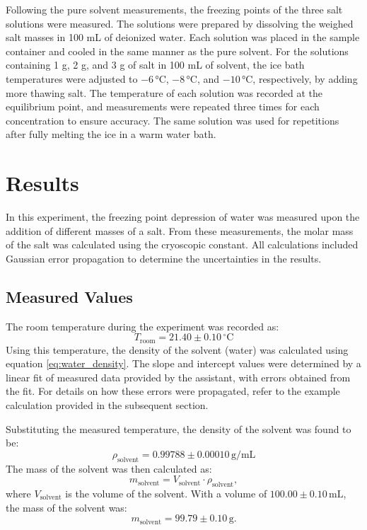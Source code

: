 \documentclass[a4paper,12pt]{article}
\begin{document}
Following the pure solvent measurements, the freezing points of the three salt solutions were measured. The solutions were prepared by dissolving the weighed salt masses in 100 mL of deionized water. Each solution was placed in the sample container and cooled in the same manner as the pure solvent. For the solutions containing 1 g, 2 g, and 3 g of salt in 100 mL of solvent, the ice bath temperatures were adjusted to $-6 \,\text{°C}$, $-8 \,\text{°C}$, and $-10 \,\text{°C}$, respectively, by adding more thawing salt. The temperature of each solution was recorded at the equilibrium point, and measurements were repeated three times for each concentration to ensure accuracy. The same solution was used for repetitions after fully melting the ice in a warm water bath.

\newpage 

\section{Results}
In this experiment, the freezing point depression of water was measured upon the addition of different masses of a salt. From these measurements, the molar mass of the salt was calculated using the cryoscopic constant. All calculations included Gaussian error propagation to determine the uncertainties in the results.

\subsection{Measured Values}
The room temperature during the experiment was recorded as:
\[
T_{\text{room}} = 21.40 \pm 0.10 \, ^\circ\text{C}
\]
Using this temperature, the density of the solvent (water) was calculated using equation \ref{eq:water_density}. The slope and intercept values were determined by a linear fit of measured data provided by the assistant, with errors obtained from the fit. For details on how these errors were propagated, refer to the example calculation provided in the subsequent section.

Substituting the measured temperature, the density of the solvent was found to be:
\[
\rho_{\text{solvent}} = 0.99788 \pm 0.00010 \, \si{\gram\per\milli\liter}
\]
The mass of the solvent was then calculated as:
\begin{equation*}
m_{\text{solvent}} = V_{\text{solvent}} \cdot \rho_{\text{solvent}},
\end{equation*}
where \(V_{\text{solvent}}\) is the volume of the solvent. With a volume of \(100.00 \pm 0.10 \, \text{mL}\), the mass of the solvent was:
\[
m_{\text{solvent}} = 99.79 \pm 0.10 \, \text{g}.
\]
\end{document}
